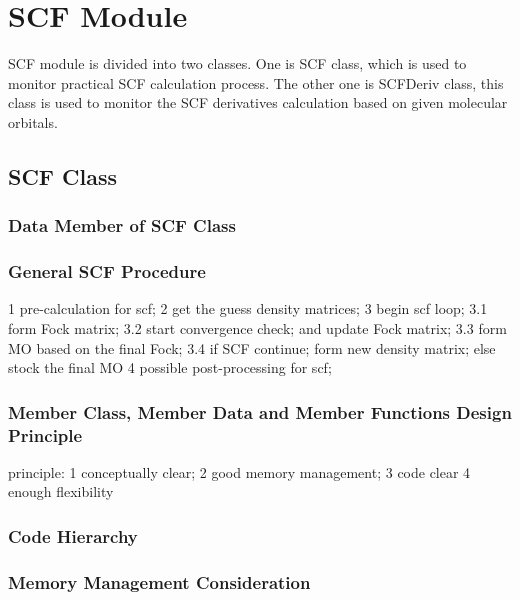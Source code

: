 %
%
\chapter{SCF Module}

SCF module is divided into two classes. One is SCF class, which is used to 
monitor practical SCF calculation process. The other one is SCFDeriv class,
this class is used to monitor the SCF derivatives calculation based on 
given molecular orbitals.

\section{SCF Class}

\subsection{Data Member of SCF Class}



\subsection{General SCF Procedure}

\begin{itemize}
 1 pre-calculation for scf;
 2 get the guess density matrices;
 3 begin scf loop;
   3.1 form Fock matrix;
   3.2 start convergence check; and update Fock matrix;
   3.3 form MO based on the final Fock;
   3.4 if SCF continue; form new density matrix; else stock the final MO
 4 possible post-processing for scf;
\end{itemize}

\subsection{Member Class, Member Data and Member Functions Design Principle}
%
%
principle:  1  conceptually clear;  2  good memory management;  3 code clear
4 enough flexibility

\subsection{Code Hierarchy}
%
%

\subsection{Memory Management Consideration}
%
%

